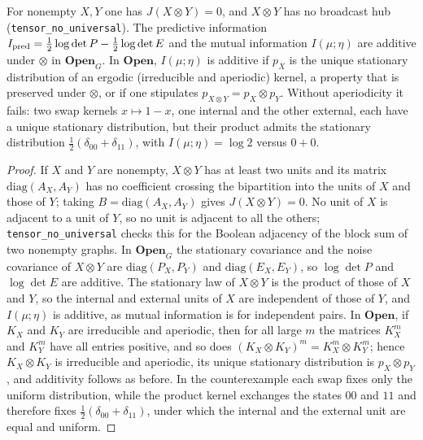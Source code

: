 \begin{proposition}\label{prop:monoidal}
For nonempty $X,Y$ one has $J(X\otimes Y)=0$, and $X\otimes Y$ has no broadcast hub (\texttt{tensor\_no\_universal}). The predictive information $I_{\rm pred}=\tfrac12\log\det P-\tfrac12\log\det E$ and the mutual information $I(\mu;\eta)$ are additive under $\otimes$ in $\mathbf{Open}_G$. In $\mathbf{Open}$, $I(\mu;\eta)$ is additive if $p_X$ is the unique stationary distribution of an ergodic (irreducible and aperiodic) kernel, a property that is preserved under $\otimes$, or if one stipulates $p_{X\otimes Y}=p_X\otimes p_Y$. Without aperiodicity it fails: two swap kernels $x\mapsto1-x$, one internal and the other external, each have a unique stationary distribution, but their product admits the stationary distribution $\tfrac12(\delta_{00}+\delta_{11})$, with $I(\mu;\eta)=\log2$ versus $0+0$.
\end{proposition}
\begin{proof}
If $X$ and $Y$ are nonempty, $X\otimes Y$ has at least two units and its matrix $\mathrm{diag}(A_X,A_Y)$ has no coefficient crossing the bipartition into the units of $X$ and those of $Y$; taking $B=\mathrm{diag}(A_X,A_Y)$ gives $J(X\otimes Y)=0$. No unit of $X$ is adjacent to a unit of $Y$, so no unit is adjacent to all the others; \texttt{tensor\_no\_universal} checks this for the Boolean adjacency of the block sum of two nonempty graphs. In $\mathbf{Open}_G$ the stationary covariance and the noise covariance of $X\otimes Y$ are $\mathrm{diag}(P_X,P_Y)$ and $\mathrm{diag}(E_X,E_Y)$, so $\log\det P$ and $\log\det E$ are additive. The stationary law of $X\otimes Y$ is the product of those of $X$ and $Y$, so the internal and external units of $X$ are independent of those of $Y$, and $I(\mu;\eta)$ is additive, as mutual information is for independent pairs. In $\mathbf{Open}$, if $K_X$ and $K_Y$ are irreducible and aperiodic, then for all large $m$ the matrices $K_X^m$ and $K_Y^m$ have all entries positive, and so does $(K_X\otimes K_Y)^m=K_X^m\otimes K_Y^m$; hence $K_X\otimes K_Y$ is irreducible and aperiodic, its unique stationary distribution is $p_X\otimes p_Y$, and additivity follows as before. In the counterexample each swap fixes only the uniform distribution, while the product kernel exchanges the states $00$ and $11$ and therefore fixes $\tfrac12(\delta_{00}+\delta_{11})$, under which the internal and the external unit are equal and uniform.
\end{proof}
